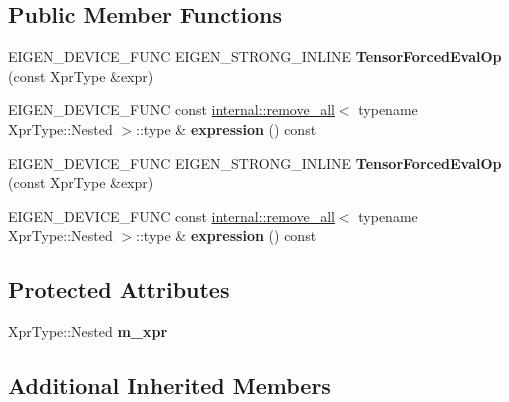 \subsection*{Public Member Functions}
\begin{DoxyCompactItemize}
\item 
\mbox{\label{class_eigen_1_1_tensor_forced_eval_op_a09586d92b4244484c497599039f8baa4}} 
E\+I\+G\+E\+N\+\_\+\+D\+E\+V\+I\+C\+E\+\_\+\+F\+U\+NC E\+I\+G\+E\+N\+\_\+\+S\+T\+R\+O\+N\+G\+\_\+\+I\+N\+L\+I\+NE {\bfseries Tensor\+Forced\+Eval\+Op} (const Xpr\+Type \&expr)
\item 
\mbox{\label{class_eigen_1_1_tensor_forced_eval_op_a62732c4754cf464802c7c74332cefae7}} 
E\+I\+G\+E\+N\+\_\+\+D\+E\+V\+I\+C\+E\+\_\+\+F\+U\+NC const \hyperlink{struct_eigen_1_1internal_1_1remove__all}{internal\+::remove\+\_\+all}$<$ typename Xpr\+Type\+::\+Nested $>$\+::type \& {\bfseries expression} () const
\item 
\mbox{\label{class_eigen_1_1_tensor_forced_eval_op_a09586d92b4244484c497599039f8baa4}} 
E\+I\+G\+E\+N\+\_\+\+D\+E\+V\+I\+C\+E\+\_\+\+F\+U\+NC E\+I\+G\+E\+N\+\_\+\+S\+T\+R\+O\+N\+G\+\_\+\+I\+N\+L\+I\+NE {\bfseries Tensor\+Forced\+Eval\+Op} (const Xpr\+Type \&expr)
\item 
\mbox{\label{class_eigen_1_1_tensor_forced_eval_op_a62732c4754cf464802c7c74332cefae7}} 
E\+I\+G\+E\+N\+\_\+\+D\+E\+V\+I\+C\+E\+\_\+\+F\+U\+NC const \hyperlink{struct_eigen_1_1internal_1_1remove__all}{internal\+::remove\+\_\+all}$<$ typename Xpr\+Type\+::\+Nested $>$\+::type \& {\bfseries expression} () const
\end{DoxyCompactItemize}
\subsection*{Protected Attributes}
\begin{DoxyCompactItemize}
\item 
\mbox{\label{class_eigen_1_1_tensor_forced_eval_op_ac80d867b8265033b76acac829ae590c0}} 
Xpr\+Type\+::\+Nested {\bfseries m\+\_\+xpr}
\end{DoxyCompactItemize}
\subsection*{Additional Inherited Members}


